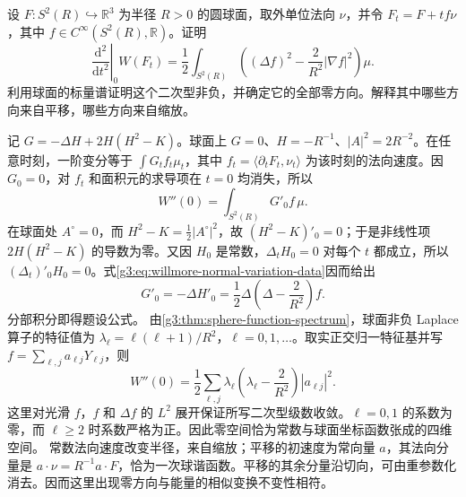 \begin{optionalexercise}\label{g3:ex:willmore-sphere-second-variation}
	设 \(F:S^2(R)\hookrightarrow\mathbb R^3\) 为半径 \(R>0\) 的圆球面，取外单位法向 \(\nu\)，并令 \(F_t=F+tf\nu\)，其中 \(f\in C^\infty(S^2(R),\mathbb R)\)。证明
	\[
		\left.\frac{\mathrm d^2}{\mathrm dt^2}\right|_0W(F_t)
		=\frac12\int_{S^2(R)}\left((\Delta f)^2-\frac2{R^2}|\nabla f|^2\right)\mu.
	\]
	利用球面的标量谱证明这个二次型非负，并确定它的全部零方向。解释其中哪些方向来自平移，哪些方向来自缩放。
\end{optionalexercise}
\begin{solution}
	记 \(G=-\Delta H+2H(H^2-K)\)。球面上 \(G=0\)、\(H=-R^{-1}\)、\(|A|^2=2R^{-2}\)。在任意时刻，一阶变分等于 \(\int G_t f_t\mu_t\)，其中 \(f_t=\langle\partial_tF_t,\nu_t\rangle\) 为该时刻的法向速度。因 \(G_0=0\)，对 \(f_t\) 和面积元的求导项在 \(t=0\) 均消失，所以
	\[
		W''(0)=\int_{S^2(R)}G'_0f\,\mu.
	\]
	在球面处 \(A^\circ=0\)，而 \(H^2-K=\tfrac12|A^\circ|^2\)，故 \((H^2-K)'_0=0\)；于是非线性项 \(2H(H^2-K)\) 的导数为零。又因 \(H_0\) 是常数，\(\Delta_tH_0=0\) 对每个 \(t\) 都成立，所以 \((\Delta_t)'_0H_0=0\)。式\eqref{g3:eq:willmore-normal-variation-data}因而给出
	\[
		G'_0=-\Delta H'_0
		=\frac12\Delta\left(\Delta-\frac2{R^2}\right)f.
	\]
	分部积分即得题设公式。
	由\cref{g3:thm:sphere-function-spectrum}，球面非负 Laplace 算子的特征值为 \(\lambda_\ell=\ell(\ell+1)/R^2\)，\(\ell=0,1,\ldots\)。取实正交归一特征基并写 \(f=\sum_{\ell,j}a_{\ell j}Y_{\ell j}\)，则
	\[
		W''(0)=\frac12\sum_{\ell,j}
		\lambda_\ell\left(\lambda_\ell-\frac2{R^2}\right)|a_{\ell j}|^2.
	\]
	这里对光滑 \(f\)，\(f\) 和 \(\Delta f\) 的 \(L^2\) 展开保证所写二次型级数收敛。\(\ell=0,1\) 的系数为零，而 \(\ell\ge2\) 时系数严格为正。因此零空间恰为常数与球面坐标函数张成的四维空间。
	常数法向速度改变半径，来自缩放；平移的初速度为常向量 \(a\)，其法向分量是 \(a\cdot\nu=R^{-1}a\cdot F\)，恰为一次球谐函数。平移的其余分量沿切向，可由重参数化消去。因而这里出现零方向与能量的相似变换不变性相符。
\end{solution}

